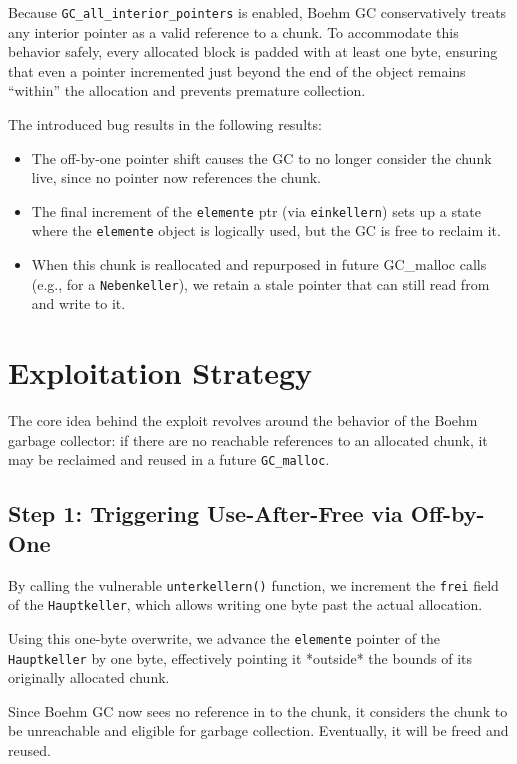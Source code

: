 \documentclass[a4paper,11pt]{article}
\begin{document}
Because \texttt{GC\_all\_interior\_pointers} is enabled, Boehm GC conservatively treats any interior pointer as a valid reference to a chunk. To accommodate this behavior safely, every allocated block is padded with at least one byte, ensuring that even a pointer incremented just beyond the end of the object remains “within” the allocation and prevents premature collection.

The introduced bug results in the following results:
\begin{itemize}
    \item The off-by-one pointer shift causes the GC to no longer consider the chunk live, since no pointer now references the chunk.
    \item The final increment of the \texttt{elemente} ptr (via \texttt{einkellern}) sets up a state where the \texttt{elemente} object is logically used, but the GC is free to reclaim it.
    \item When this chunk is reallocated and repurposed in future GC\_malloc calls (e.g., for a \texttt{Nebenkeller}), we retain a stale pointer that can still read from and write to it.
\end{itemize}


\section{Exploitation Strategy}

The core idea behind the exploit revolves around the behavior of the Boehm garbage collector: 
if there are no reachable references to an allocated chunk, it may be reclaimed and reused in a future \texttt{GC\_malloc}.

\subsection*{Step 1: Triggering Use-After-Free via Off-by-One}

By calling the vulnerable \texttt{unterkellern()} function, we increment the \texttt{frei} field of the \texttt{Hauptkeller}, which allows writing one byte past the actual allocation.

Using this one-byte overwrite, we advance the \texttt{elemente} pointer of the \texttt{Hauptkeller} by one byte, effectively pointing it *outside* the bounds of its originally allocated chunk.

Since Boehm GC now sees no reference in to the chunk, it considers the chunk to be unreachable and eligible for garbage collection. Eventually, it will be freed and reused.
\end{document}
